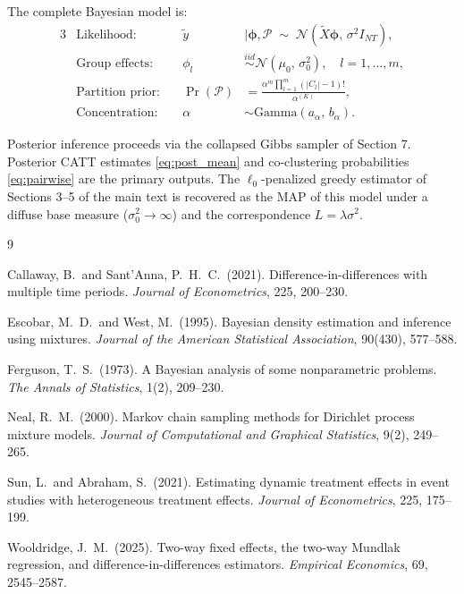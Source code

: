 \documentclass[12pt]{article}
\newcommand{\Normal}{\mathcal{N}}
\newcommand{\1}{\mathbbm{1}}
\newcommand{\ytd}{\tilde{y}}
\newcommand{\Xtd}{\tilde{X}}
\begin{document}
The complete Bayesian model is:
\begin{alignat}{3}
  &\text{Likelihood:}\quad & \ytd &\mid \bm{\phi}, \mathcal{P} \;\sim\; \Normal(\Xtd\bm{\phi},\,\sigma^2 I_{NT}), \\
  &\text{Group effects:}\quad & \phi_l &\overset{iid}{\sim} \Normal(\mu_0,\,\sigma_0^2), \quad l=1,\ldots,m, \\
  &\text{Partition prior:}\quad & \Pr(\mathcal{P}) &= \frac{\alpha^m\prod_{l=1}^{m}(|C_l|-1)!}{\alpha^{(K)}}, \\
  &\text{Concentration:}\quad & \alpha &\sim \mathrm{Gamma}(a_\alpha,\, b_\alpha).
\end{alignat}

Posterior inference proceeds via the collapsed Gibbs sampler of Section 7.
Posterior CATT estimates \eqref{eq:post_mean} and co-clustering probabilities
\eqref{eq:pairwise} are the primary outputs. The $\ell_0$-penalized greedy
estimator of Sections 3--5 of the main text is recovered as the MAP of this
model under a diffuse base measure ($\sigma_0^2\to\infty$) and the
correspondence $L = \lambda\sigma^2$.


\begin{thebibliography}{9}

Callaway, B.\ and Sant'Anna, P.\ H.\ C.\ (2021).
\newblock Difference-in-differences with multiple time periods.
\newblock \textit{Journal of Econometrics}, 225, 200--230.

Escobar, M.\ D.\ and West, M.\ (1995).
\newblock Bayesian density estimation and inference using mixtures.
\newblock \textit{Journal of the American Statistical Association}, 90(430), 577--588.

Ferguson, T.\ S.\ (1973).
\newblock A Bayesian analysis of some nonparametric problems.
\newblock \textit{The Annals of Statistics}, 1(2), 209--230.

Neal, R.\ M.\ (2000).
\newblock Markov chain sampling methods for Dirichlet process mixture models.
\newblock \textit{Journal of Computational and Graphical Statistics}, 9(2), 249--265.

Sun, L.\ and Abraham, S.\ (2021).
\newblock Estimating dynamic treatment effects in event studies with
  heterogeneous treatment effects.
\newblock \textit{Journal of Econometrics}, 225, 175--199.

Wooldridge, J.\ M.\ (2025).
\newblock Two-way fixed effects, the two-way Mundlak regression, and
  difference-in-differences estimators.
\newblock \textit{Empirical Economics}, 69, 2545--2587.

\end{thebibliography}
\end{document}
